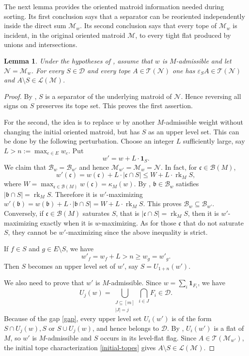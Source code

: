 \documentclass[10pt]{amsart}
\theoremstyle{plain}
\newtheorem{lemma}[theorem]{Lemma}
\theoremstyle{definition}
\newcommand{\one}{\mathbf{1}}
\newcommand{\B}{\mathcal{B}}
\newcommand{\D}{\mathcal{D}}
\newcommand{\T}{\mathcal{T}}
\newcommand{\M}{\mathcal{M}}
\newcommand{\N}{\mathcal{N}}
\newcommand{\Lcov}{\mathcal{L}}
\newcommand{\rk}{\operatorname{rk}}
\newcommand{\eps}{\varepsilon}
\newcommand{\bb}{\mathfrak{b}}
\newcommand{\cc}{\mathfrak{c}}
\begin{document}
The next lemma provides the oriented matroid information needed during sorting. Its first conclusion says that a separator can be reoriented independently inside the direct sum $\M_w$. Its second conclusion says that every tope of $\M_w$ is incident, in the original oriented matroid $\M$, to every tight flat produced by unions and intersections.

\begin{lemma}\label{tight-tope-incidence}
Under the hypotheses of , assume that $w$ is $M$-admissible and let $\N=\M_w$. For every $S\in\D$ and every tope $A\in\T(\N)$ one has $\eps_SA\in\T(\N)$ and $A\setminus S\in\Lcov(\M)$.
\end{lemma}

\begin{proof}
By , $S$ is a separator of the underlying matroid of $\N$. Hence reversing all signs on $S$ preserves its tope set. This proves the first assertion.

For the second, the idea is to replace $w$ by another $M$-admissible weight without changing the initial oriented matroid, but has $S$ as an upper level set. This can be done by the following perturbation. Choose an integer $L$ sufficiently large, say $L>n:=\max_{e\in E}w_e$. Put
\[
w'=w+L\cdot\one_S.
\]
We claim that $\B_w=\B_{w'}$ and hence $\M_{w'}=\M_w=\N$. In fact, for $\cc\in\B(M)$,
\[
w'(\cc)=w(\cc)+L\cdot|\cc\cap S|\leq W+L\cdot\rk_MS,
\]
where $W=\max_{\mathfrak c\in\B(M)}w(\mathfrak c)=\kappa_M(w)$. By , $\bb\in\B_w$ satisfies $|\bb\cap S|=\rk_MS$. Therefore it is $w'$-maximizing $w'(\bb)=w(\bb)+L\cdot|\bb\cap S|= W+L\cdot\rk_MS$. This proves $\B_w\subseteq \B_{w'}$. Conversely, if $\cc\in\B(M)$ saturates $S$, that is $|\cc\cap S|=\rk_MS$, then it is $w'$-maximizing exactly when it is $w$-maximizing. As for those $\cc$ that do not saturate $S$, they cannot be $w'$-maximizing since the above inequality is strict.

If $f\in S$ and $g\in E\setminus S$, we have
\begin{equation}\label{gap}
w'_f=w_f+L>n\geq w_g=w'_g.    
\end{equation}
Then $S$ becomes an upper level set of $w'$, say $S=U_{1+n}(w')$.

We also need to prove that $w'$ is $M$-admissible. Since $w=\sum_i\one_{F_i}$, we have
\[
U_j(w)=\bigcup_{\substack{J\subseteq[m]\\|J|=j}}\bigcap_{i\in J}F_i\in \D.
\]
Because of the gap \eqref{gap}, every upper level set $U_i(w')$ is of the form $S\cap U_j(w),S$ or $S\cup U_j(w)$, and hence belongs to $\D$. By , $U_i(w')$ is a flat of $M$, so $w'$ is $M$-admissible and $S$ occurs in its level-flat flag. Since $A\in\T(\M_{w'})$, the initial tope characterization \eqref{initial-topes} gives $A\setminus S\in\Lcov(\M)$.
\end{proof}
\end{document}
